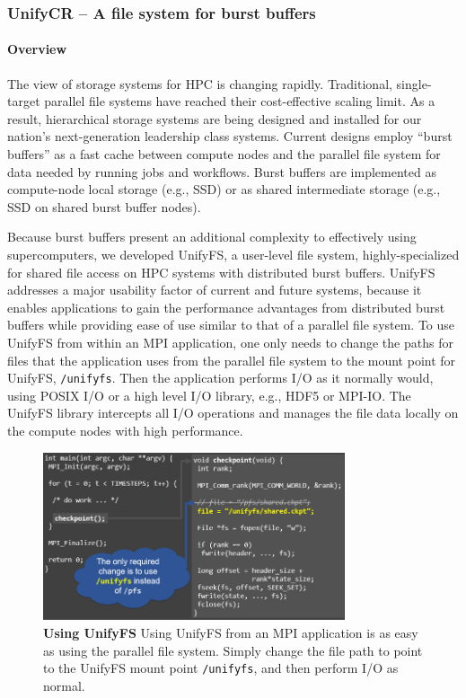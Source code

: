 \subsubsection{ UnifyCR -- A file system for burst buffers} 

\paragraph{Overview} 

The view of storage systems for HPC is changing rapidly. Traditional, 
single-target parallel file systems have reached their cost-effective 
scaling limit. As a result, hierarchical storage systems are being designed 
and installed for our nation's next-generation leadership class systems. 
Current designs employ “burst buffers” as a fast cache between compute 
nodes and the parallel file system for data needed by running jobs and 
workflows. Burst buffers are implemented as compute-node local storage 
(e.g., SSD) or as shared intermediate storage (e.g., SSD on shared burst 
buffer nodes).

Because burst buffers present an additional complexity to effectively
using supercomputers, we developed UnifyFS, a user-level file system, 
highly-specialized for shared file access on HPC systems with distributed 
burst buffers.  UnifyFS addresses a major usability 
factor of current and future systems, because it enables
applications to gain the performance advantages from distributed burst buffers 
while providing ease of use similar to that of a parallel file system.
To use UnifyFS from within an MPI application, one only needs to change 
the paths for files that the application uses from the parallel file system 
to the mount point for UnifyFS, \texttt{/unifyfs}. Then the application
performs I/O as it normally would, using POSIX I/O or a high level I/O library, e.g.,
HDF5 or MPI-IO. The UnifyFS library intercepts all I/O operations and 
manages the file data locally on the compute nodes with high performance.

\begin{figure}[htb]
        \centering
        \includegraphics[width=3.5in]{usingUnifyFS}
        \caption{\label{fig:usingUnifyFS} \textbf{Using UnifyFS} 
Using UnifyFS from an MPI application is as easy as using the parallel file system. 
Simply change the file path to point to the UnifyFS mount point \texttt{/unifyfs}, and
then perform I/O as normal.} 
\end{figure}


